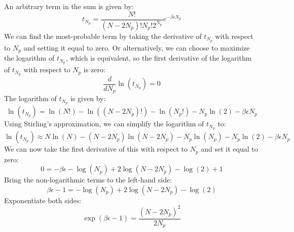 \documentclass[12pt]{article}
\begin{document}
\subsection{}
An arbitrary term in the sum is given by:
\begin{equation}
  t_{N_p} = \frac{N !}{\left(N-2 N_{p}\right) ! N_{p} ! 2^{N_{p}}} e^{-\beta \epsilon N_p}
\end{equation}
We can find the most-probable term by taking the derivative of $t_{N_p}$ with respect to $N_p$ and setting it equal to zero. Or alternatively, we can choose to maximize the logarithm of $t_{N_p}$, which is equivalent, so the first derivative of the logarithm of $t_{N_p}$ with respect to $N_p$ is zero:
\begin{equation}
  \frac{d}{dN_p} \ln(t_{N_p}) = 0
\end{equation}
The logarithm of $t_{N_p}$ is given by:
\begin{equation}
  \ln(t_{N_p}) = \ln(N!) - \ln((N-2N_p)!) - \ln(N_p!) - N_p \ln(2) - \beta \epsilon N_p
\end{equation}
Using Stirling's approximation, we can simplify the logarithm of $t_{N_p}$ to:
\begin{equation}
  \ln(t_{N_p}) \approx N \ln(N) - (N-2N_p) \ln(N-2N_p) - N_p \ln(N_p) - N_p \ln(2) - \beta \epsilon N_p
\end{equation}
We can now take the first derivative of this with respect to $N_p$ and set it equal to zero:
\begin{equation}
  0 = - \beta \epsilon - \log{\left(N_p \right)} + 2 \log{\left(N - 2 N_p \right)} - \log{\left(2 \right)} + 1
\end{equation}
Bring the non-logarithmic terms to the left-hand side:
\begin{equation}
  \beta \epsilon - 1 = - \log{\left(N_p \right)} + 2 \log{\left(N - 2 N_p \right)} - \log{\left(2 \right)}
\end{equation}
Exponentiate both sides:
\begin{equation}
  \exp{\left(\beta \epsilon - 1 \right)} = \frac{(N - 2 N_p)^2}{2N_p}
\end{equation}
\end{document}
